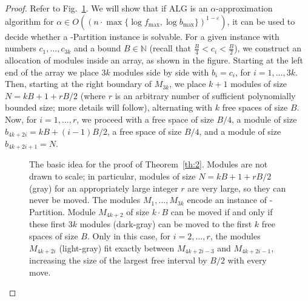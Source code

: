 \documentclass{article}
\newcommand{\N}{\mathbb{N}}
\def\fmax{f_{\mathrm{max}}}
\def\bmax{b_{\mathrm{max}}}
\def\alg{\mathrm{ALG}}
\begin{document}
\begin{proof}
Refer to Fig.~\ref{fig:nolinapx}.
We will show that if $\alg$ is an $\alpha$-approximation algorithm for \linebreak
$\alpha \in O( (n\cdot\max\{\log\fmax,\log\bmax\})^{1-\varepsilon} )$, it
can be used to decide whether a {-Partition} instance is solvable. For a given
instance with numbers $c_1,\ldots,c_{3k}$ and a bound
$B\in \N$ (recall that $\frac{B}{4} < c_i < \frac{B}{2}$), we
construct an allocation of modules inside an array, as shown in the figure.
Starting at the left end of the array we
place $3k$ modules side by side with $b_i = c_i$, for
$i=1,\ldots,3k$. Then, starting at the right boundary of $M_{3k}$,
we place $k+1$ modules of size $N = kB + 1 + rB/2$ (where $r$ is an arbitrary number of sufficient polynomially bounded size; more details will follow), 
alternating with
$k$ free spaces of size $B$. Now, for $i=1,\ldots,r$, we proceed
with a free space of size $B/4$, a module of size $b_{4k+2i} = kB +
(i-1)B/2$, a free space of size $B/4$, and a module of size
$b_{4k+2i+1} = N$.

\begin{figure}[t]
                        \centering {} \caption{\label{fig:nolinapx} The basic idea for the proof of Theorem~\ref{th:2}.
Modules are not drawn to scale; in particular,
modules of size $N=kB +
1 + rB/2$ (gray) for an appropriately large integer $r$ are very large, so they can never be moved. 
The modules $M_1,\ldots,M_{3k}$ encode an instance of {-Partition}.
Module $M_{4k+2}$ of size $k\cdot B$ can be
moved if and only if these first $3k$ modules (dark-gray) can be moved to the first
$k$ free spaces of size $B$. Only in this case, for $i=2,\ldots,r$, the modules
$M_{4k+2i}$ (light-gray) fit exactly between $M_{4k+2i-3}$ and
$M_{4k+2i-1}$, increasing the size of the largest free interval by
$B/2$ with every move.}
\end{figure}



\end{proof}
\end{document}
